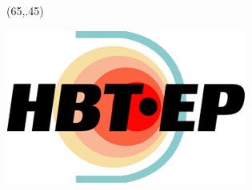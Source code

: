 \documentclass{article}
\begin{document}
\begin{textblock}{1}(65,.45)

\includegraphics[scale =1]{hbt_logo.png}

\end{textblock}

\vspace{120mm}



\end{document}
